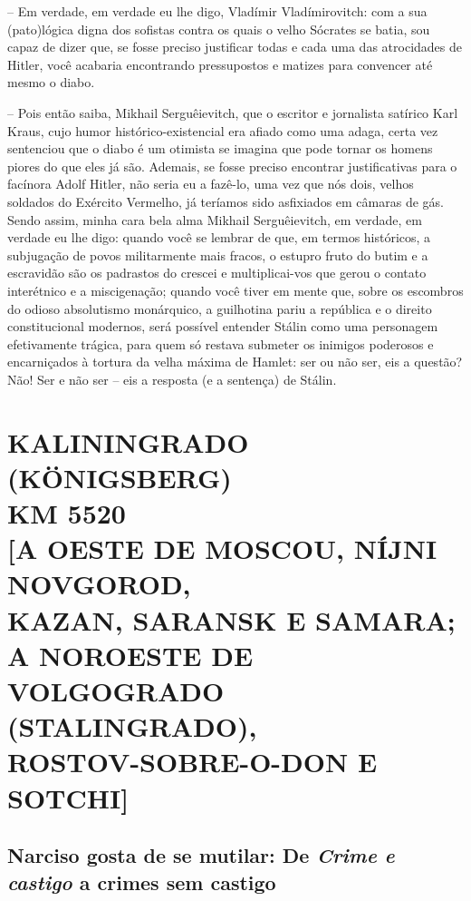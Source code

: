 -- Em verdade, em verdade eu lhe digo, Vladímir Vladímirovitch: com a
sua (pato)lógica digna dos sofistas contra os quais o velho Sócrates se
batia, sou capaz de dizer que, se fosse preciso justificar todas e cada
uma das atrocidades de Hitler, você acabaria encontrando pressupostos e
matizes para convencer até mesmo o diabo.

-- Pois então saiba, Mikhail Serguêievitch, que o escritor e jornalista
satírico Karl Kraus, cujo humor histórico-existencial era afiado como
uma adaga, certa vez sentenciou que o diabo é um otimista se imagina que
pode tornar os homens piores do que eles já são. Ademais, se fosse
preciso encontrar justificativas para o facínora Adolf Hitler, não seria
eu a fazê-lo, uma vez que nós dois, velhos soldados do Exército
Vermelho, já teríamos sido asfixiados em câmaras de gás. Sendo assim,
minha cara bela alma Mikhail Serguêievitch, em verdade, em verdade eu
lhe digo: quando você se lembrar de que, em termos históricos, a
subjugação de povos militarmente mais fracos, o estupro fruto do butim e
a escravidão são os padrastos do crescei e multiplicai-vos que gerou o
contato interétnico e a miscigenação; quando você tiver em mente que,
sobre os escombros do odioso absolutismo monárquico, a guilhotina pariu
a república e o direito constitucional modernos, será possível entender
Stálin como uma personagem efetivamente trágica, para quem só restava
submeter os inimigos poderosos e encarniçados à tortura da velha máxima
de Hamlet: ser ou não ser, eis a questão? Não! Ser e não ser -- eis a
resposta (e a sentença) de Stálin.

\newpage
{}
\part*{KALININGRADO (KÖNIGSBERG)\\KM 5520\\{[}A OESTE DE MOSCOU, NÍJNI NOVGOROD,\\KAZAN, SARANSK E SAMARA;\\A NOROESTE DE VOLGOGRADO (STALINGRADO),\\ROSTOV-SOBRE-O-DON E SOTCHI{]}}

\chapter*{Narciso gosta de se mutilar: De \emph{Crime e castigo} a crimes sem castigo}


